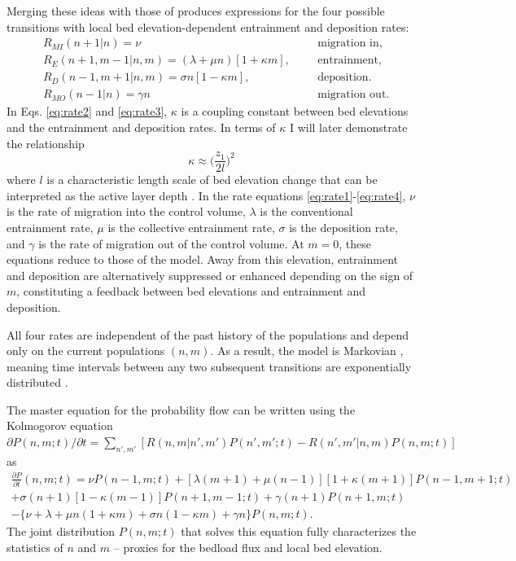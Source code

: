 Merging these ideas with those of \citet{Ancey2008} produces expressions for the four possible transitions with local bed elevation-dependent entrainment and deposition rates:
\begin{align}
	&R_{MI}(n+1|n) = \nu && &\text{migration in}, \label{eq:rate1}\\
	&R_E(n+1,m-1|n,m)=(\lambda + \mu n)[1 + \kappa m], && &\text{entrainment}, \label{eq:rate2}\\
	&R_D(n-1,m+1|n,m)=\sigma n [1- \kappa m ], && &\text{deposition}. \label{eq:rate3} \\
	&R_{MO}(n-1|n) =\gamma n && &\text{migration out} \label{eq:rate4}.
\end{align}
In Eqs. \ref{eq:rate2} and \ref{eq:rate3}, $\kappa$ is a coupling constant between bed elevations and the entrainment and deposition rates.
In terms of $\kappa$ I will later demonstrate the relationship
\begin{equation}\kappa \approx \big(\frac{z_1}{2l}\big)^2 \label{eq:active}
\end{equation}
where $l$ is a characteristic length scale of bed elevation change that can be interpreted as the active layer depth \citep{Wong2007,Church2017}.
In the rate equations \ref{eq:rate1}-\ref{eq:rate4}, $\nu$ is the rate of migration into the control volume, $\lambda$ is the conventional entrainment rate, $\mu$ is the collective entrainment rate, $\sigma$ is the deposition rate, and $\gamma$ is the rate of migration out of the control volume.
At $m=0$, these equations reduce to those of the \citet{Ancey2008} model.
Away from this elevation, entrainment and deposition are alternatively suppressed or enhanced depending on the sign of $m$, constituting a feedback between bed elevations and entrainment and deposition.

All four rates are independent of the past history of the populations and depend only on the current populations $(n,m)$. 
As a result, the model is Markovian \citep{Cox1965, VanKampen2007}, meaning time intervals between any two subsequent transitions are exponentially distributed \citep{Gillespie2007}.

The master equation for the probability flow can be written using the Kolmogorov equation
 $\partial P(n,m;t)/\partial t = 
\sum_{n',m'} [R(n,m|n',m')P(n',m';t)-R(n',m'|n,m)P(n,m;t)]$ \citep{Cox1965, Gillespie1991, Ancey2008} as 
\begin{multline}
	\frac{\partial P}{\partial t}(n,m;t) =  
	\nu P(n-1,m;t) + [\lambda(m+1) + \mu(n-1)][1+\kappa(m+1)]P(n-1,m+1;t)\\  
	+ \sigma(n+1)[1-\kappa(m-1)]P(n+1,m-1;t) + \gamma(n+1) P(n+1,m;t) \\
	- 
	\{ \nu + \lambda+ \mu n (1+\kappa m) +  \sigma n ( 1- \kappa m) + \gamma n \}P(n,m;t).
	\label{eq:elemaster}
\end{multline}
The joint distribution $P(n,m;t)$ that solves this equation fully characterizes the statistics of $n$ and $m$ -- proxies for the bedload flux and local bed elevation.

